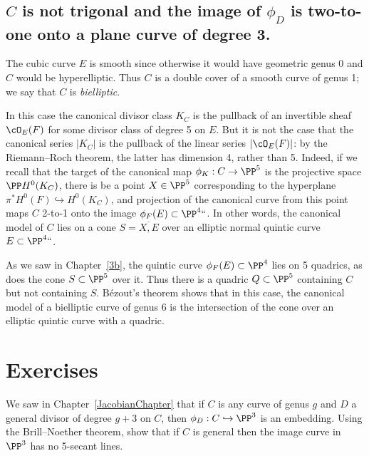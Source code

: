 \subsection*{$C$ is not trigonal and the image of
\texorpdfstring{$\phi_{D}$}{phi(D)} is two-to-one onto a  plane curve
of degree 3.}

The cubic curve $E$ is smooth since otherwise it would have geometric
genus 0 and $C$ would be  hyperelliptic. Thus $C$ is a double cover of
a smooth curve of genus 1; we say that $C$ is \emph{bielliptic}.
%

In this case the canonical divisor class $K_C$ is the pullback of
an invertible sheaf $\cO_E(F)$ for some divisor class of degree 5 on
$E$. But it is not the case that the canonical series $|K_C|$ is the
pullback of the linear series $|\cO_E(F)|$: by the Riemann--Roch theorem,
the latter has dimension 4, rather than 5. Indeed, if we recall that
the target of the canonical map $\phi_K : C \to \PP^5$ is the projective
space $\PP H^0(K_C)$, there is be a point $X \in \PP^5$ corresponding to
the hyperplane $\pi^*H^0(F) \hookrightarrow H^0(K_C)$, and projection
of the canonical curve from this point maps $C$ 2-to-1 onto the image
$\phi_F(E) \subset \PP^4` `$. In other words, the canonical model of $C$
lies on a cone $S = \overline{X, E}$ over an elliptic normal quintic
curve $E \subset \PP^4` `$.

As we saw in Chapter~\ref{3b}, the quintic curve $\phi_F(E) \subset \PP^4$
lies on 5 quadrics, as does the cone $S \subset \PP^5$ over it. Thus
there is a quadric $Q \subset \PP^5$ containing $C$ but not containing
$S$. B\'ezout's theorem shows that in this case, the canonical model of
a bielliptic curve of genus 6 is the intersection of the cone over an
elliptic quintic curve with a quadric.

\section{Exercises}

\begin{exercise}
\label{out of place}
We saw in Chapter~\ref{JacobianChapter} that if $C$ is any curve of genus
$g$ and $D$ a general divisor of degree $g+3$ on $C$, then $\phi_D :
C \hookrightarrow \PP^3$ is an embedding. Using the Brill--Noether
theorem, show that if $C$ is general then the image curve in $\PP^3$
has no 5-secant lines.
\end{exercise}

